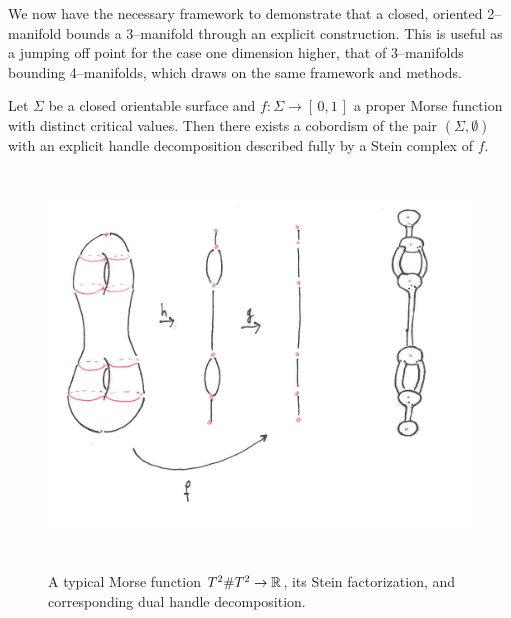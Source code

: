 \label{sec:2bound3}

We now have the necessary framework to demonstrate that a closed, oriented 2--manifold bounds a 3--manifold through an explicit construction.
This is useful as a jumping off point for the case one dimension higher, that of 3--manifolds bounding 4--manifolds, which draws on the same framework and methods.

\begin{theorem}
	\label{thm:2bound3}
	Let $\Sigma$ be a closed orientable surface and $f:\Sigma\to[\,0,1\,]$ a proper Morse function with distinct critical values.
	Then there exists a cobordism of the pair $(\Sigma,\emptyset)$ with an explicit handle decomposition described fully by a Stein complex of $f$.
\end{theorem}

\begin{figure}
	\caption{A typical Morse function $T^2\# T^2\to\mathbb{R}$, its Stein factorization, and corresponding dual handle decomposition.}
	\centering
	\includegraphics[height=4in]{figures/typicalmorse.jpg}
	\label{fig:typicalmorse}
\end{figure}

